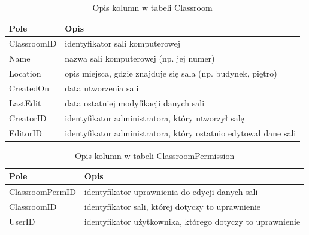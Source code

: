 \begin{table}[!ht]
\caption{\label{tab:classroom_descr}Opis kolumn w tabeli Classroom}
\begin{tabular}{| m{3.5cm} | m{10.5cm} |} 

\hline
Pole & Opis\\ \hline

ClassroomID & identyfikator sali komputerowej \\ \hline
Name & nazwa sali komputerowej  (np. jej numer)\\ \hline
Location & opis miejsca, gdzie znajduje się sala (np. budynek, piętro) \\ \hline
CreatedOn & data utworzenia sali \\ \hline
LastEdit & data ostatniej modyfikacji danych sali \\ \hline
CreatorID & identyfikator administratora, który utworzył salę \\ \hline
EditorID & identyfikator administratora, który ostatnio edytował dane sali\\ \hline
\end{tabular}
\end{table}

\begin{table}[!ht]
\caption{\label{tab:croomperm_descr}Opis kolumn w tabeli ClassroomPermission}
\begin{tabular}{| m{3.5cm} | m{10.5cm} |} 

\hline
Pole & Opis\\ \hline

ClassroomPermID & identyfikator uprawnienia do edycji danych sali \\ \hline
ClassroomID & identyfikator sali, której dotyczy to uprawnienie \\ \hline
UserID & identyfikator użytkownika, którego dotyczy to uprawnienie\\ \hline

\end{tabular}
\end{table}

